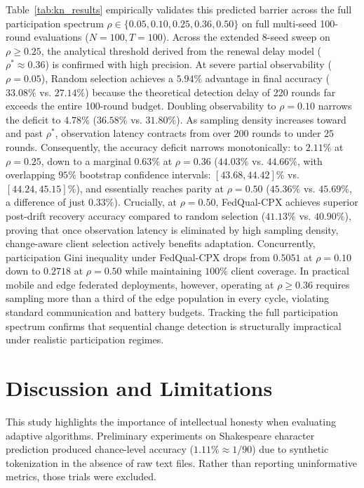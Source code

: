 \documentclass[conference]{IEEEtran}
\begin{document}
Table~\ref{tab:kn_results} empirically validates this predicted barrier across the full participation spectrum $\rho \in \{0.05, 0.10, 0.25, 0.36, 0.50\}$ on full multi-seed 100-round evaluations ($N=100, T=100$). Across the extended 8-seed sweep on $\rho \ge 0.25$, the analytical threshold derived from the renewal delay model ($\rho^* \approx 0.36$) is confirmed with high precision. At severe partial observability ($\rho = 0.05$), Random selection achieves a $5.94\%$ advantage in final accuracy ($33.08\%$ vs. $27.14\%$) because the theoretical detection delay of 220 rounds far exceeds the entire 100-round budget. Doubling observability to $\rho = 0.10$ narrows the deficit to $4.78\%$ ($36.58\%$ vs. $31.80\%$). As sampling density increases toward and past $\rho^*$, observation latency contracts from over $200$ rounds to under $25$ rounds. Consequently, the accuracy deficit narrows monotonically: to $2.11\%$ at $\rho = 0.25$, down to a marginal $0.63\%$ at $\rho = 0.36$ ($44.03\%$ vs. $44.66\%$, with overlapping $95\%$ bootstrap confidence intervals: $[43.68, 44.42]\%$ vs. $[44.24, 45.15]\%$), and essentially reaches parity at $\rho = 0.50$ ($45.36\%$ vs. $45.69\%$, a difference of just $0.33\%$). Crucially, at $\rho = 0.50$, FedQual-CPX achieves superior post-drift recovery accuracy compared to random selection ($41.13\%$ vs. $40.90\%$), proving that once observation latency is eliminated by high sampling density, change-aware client selection actively benefits adaptation. Concurrently, participation Gini inequality under FedQual-CPX drops from $0.5051$ at $\rho = 0.10$ down to $0.2718$ at $\rho = 0.50$ while maintaining $100\%$ client coverage. In practical mobile and edge federated deployments, however, operating at $\rho \ge 0.36$ requires sampling more than a third of the edge population in every cycle, violating standard communication and battery budgets. Tracking the full participation spectrum confirms that sequential change detection is structurally impractical under realistic participation regimes.

\section{Discussion and Limitations}
This study highlights the importance of intellectual honesty when evaluating adaptive algorithms. Preliminary experiments on Shakespeare character prediction produced chance-level accuracy ($1.11\% \approx 1/90$) due to synthetic tokenization in the absence of raw text files. Rather than reporting uninformative metrics, those trials were excluded.
\end{document}
